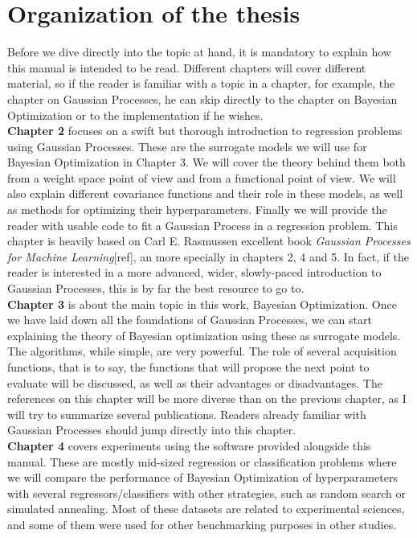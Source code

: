 \documentclass[10pt,a4paper,twoside]{book}
\begin{document}
\section{Organization of the thesis}

Before we dive directly into the topic at hand, it is mandatory to explain how this manual is intended to be read. Different chapters will cover different material, so if the reader is familiar with a topic in a chapter, for example, the chapter on Gaussian Processes, he can skip directly to the chapter on Bayesian Optimization or to the implementation if he wishes. \\

\textbf{Chapter 2} focuses on a swift but thorough introduction to regression problems using Gaussian Processes. These are the surrogate models we will use for Bayesian Optimization in Chapter 3. We will cover the theory behind them both from a weight space point of view and from a functional point of view. We will also explain different covariance functions and their role in these models, as well as methods for optimizing their hyperparameters. Finally we will provide the reader with usable code to fit a Gaussian Process in a regression problem. This chapter is heavily based on Carl E. Rasmussen excellent book \textit{Gaussian Processes for Machine Learning}[ref], an more specially in chapters 2, 4 and 5. In fact, if the reader is interested in a more advanced, wider, slowly-paced introduction to Gaussian Processes, this is by far the best resource to go to. \\

\textbf{Chapter 3} is about the main topic in this work, Bayesian Optimization. Once we have laid down all the foundations of Gaussian Processes, we can start explaining the theory of Bayesian optimization using these as surrogate models. The algorithms, while simple, are very powerful. The role of several acquisition functions, that is to say, the functions that will propose the next point to evaluate will be discussed, as well as their advantages or disadvantages. The references on this chapter will be more diverse than on the previous chapter, as I will try to summarize several publications. Readers already familiar with Gaussian Processes should jump directly into this chapter.\\

\textbf{Chapter 4} covers experiments using the software provided alongside this manual. These are mostly mid-sized regression or classification problems where we will compare the performance of Bayesian Optimization of hyperparameters with several regressors/classifiers with other strategies, such as random search or simulated annealing. Most of these datasets are related to experimental sciences, and some of them were used for other benchmarking purposes in other studies. \\
\end{document}
